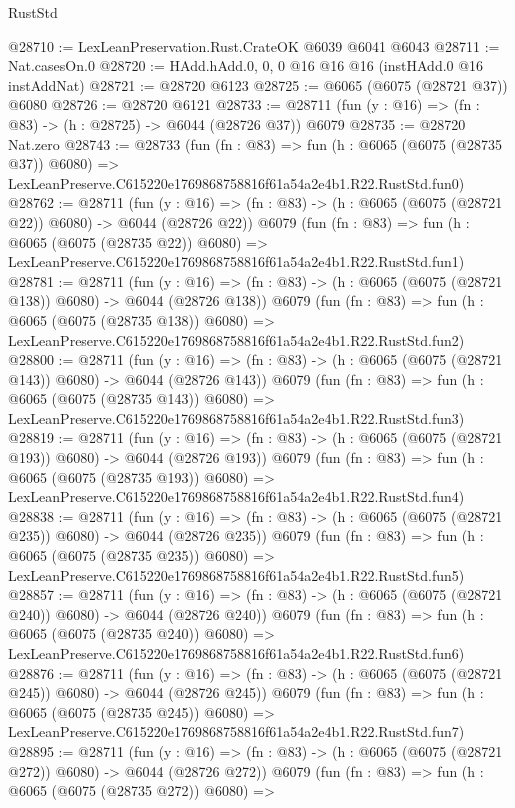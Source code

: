 \begin{lexlean}{RustStd}
\begin{coremodule}
@28710 := LexLeanPreservation.Rust.CrateOK @6039 @6041 @6043
@28711 := Nat.casesOn.{0}
@28720 := HAdd.hAdd.{0, 0, 0} @16 @16 @16 (instHAdd.{0} @16 instAddNat)
@28721 := @28720 @6123
@28725 := @6065 (@6075 (@28721 @37)) @6080
@28726 := @28720 @6121
@28733 := @28711 (fun (y : @16) => (fn : @83) -> (h : @28725) -> @6044 (@28726 @37)) @6079
@28735 := @28720 Nat.zero
@28743 := @28733
    (fun (fn : @83) =>
    fun (h : @6065 (@6075 (@28735 @37)) @6080) =>
    LexLeanPreserve.C615220e1769868758816f61a54a2e4b1.R22.RustStd.fun0)
@28762 := @28711
    (fun (y : @16) => (fn : @83) -> (h : @6065 (@6075 (@28721 @22)) @6080) -> @6044 (@28726 @22))
    @6079
    (fun (fn : @83) =>
    fun (h : @6065 (@6075 (@28735 @22)) @6080) =>
    LexLeanPreserve.C615220e1769868758816f61a54a2e4b1.R22.RustStd.fun1)
@28781 := @28711
    (fun (y : @16) => (fn : @83) -> (h : @6065 (@6075 (@28721 @138)) @6080) -> @6044 (@28726 @138))
    @6079
    (fun (fn : @83) =>
    fun (h : @6065 (@6075 (@28735 @138)) @6080) =>
    LexLeanPreserve.C615220e1769868758816f61a54a2e4b1.R22.RustStd.fun2)
@28800 := @28711
    (fun (y : @16) => (fn : @83) -> (h : @6065 (@6075 (@28721 @143)) @6080) -> @6044 (@28726 @143))
    @6079
    (fun (fn : @83) =>
    fun (h : @6065 (@6075 (@28735 @143)) @6080) =>
    LexLeanPreserve.C615220e1769868758816f61a54a2e4b1.R22.RustStd.fun3)
@28819 := @28711
    (fun (y : @16) => (fn : @83) -> (h : @6065 (@6075 (@28721 @193)) @6080) -> @6044 (@28726 @193))
    @6079
    (fun (fn : @83) =>
    fun (h : @6065 (@6075 (@28735 @193)) @6080) =>
    LexLeanPreserve.C615220e1769868758816f61a54a2e4b1.R22.RustStd.fun4)
@28838 := @28711
    (fun (y : @16) => (fn : @83) -> (h : @6065 (@6075 (@28721 @235)) @6080) -> @6044 (@28726 @235))
    @6079
    (fun (fn : @83) =>
    fun (h : @6065 (@6075 (@28735 @235)) @6080) =>
    LexLeanPreserve.C615220e1769868758816f61a54a2e4b1.R22.RustStd.fun5)
@28857 := @28711
    (fun (y : @16) => (fn : @83) -> (h : @6065 (@6075 (@28721 @240)) @6080) -> @6044 (@28726 @240))
    @6079
    (fun (fn : @83) =>
    fun (h : @6065 (@6075 (@28735 @240)) @6080) =>
    LexLeanPreserve.C615220e1769868758816f61a54a2e4b1.R22.RustStd.fun6)
@28876 := @28711
    (fun (y : @16) => (fn : @83) -> (h : @6065 (@6075 (@28721 @245)) @6080) -> @6044 (@28726 @245))
    @6079
    (fun (fn : @83) =>
    fun (h : @6065 (@6075 (@28735 @245)) @6080) =>
    LexLeanPreserve.C615220e1769868758816f61a54a2e4b1.R22.RustStd.fun7)
@28895 := @28711
    (fun (y : @16) => (fn : @83) -> (h : @6065 (@6075 (@28721 @272)) @6080) -> @6044 (@28726 @272))
    @6079
    (fun (fn : @83) =>
    fun (h : @6065 (@6075 (@28735 @272)) @6080) =>

\end{coremodule}
\end{lexlean}
